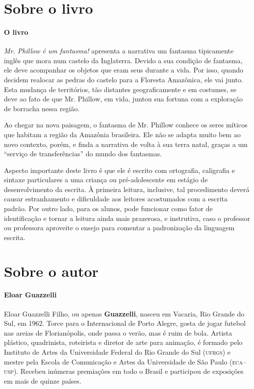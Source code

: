 \documentclass[11pt]{extarticle}
\begin{document}
\section{Sobre o livro}

\paragraph{O livro} \textit{Mr. Phillow é um fantasma!} apresenta a narrativa um fantasma tipicamente inglês 
que mora num castelo da Inglaterra. Devido a sua condição de fantasma, ele deve acompanhar
os objetos que eram seus durante a vida. Por isso, quando decidem realocar as pedras do castelo para 
a Floresta Amazônica, ele vai junto. Esta mudança de territórios, tão distantes geograficamente
e em costumes, se deve ao fato de que Mr. Phillow, em vida, juntou sua fortuna com a exploração de borracha
nessa região.

Ao chegar na nova paisagem, o fantasma de Mr. Phillow conhece os seres míticos que habitam a região da Amazônia
brasileira. Ele não se adapta muito bem ao novo contexto, porém, e finda a narrativa de volta à sua
terra natal, graças a um ``serviço de transferências'' do mundo dos fantasmas. 

Aspecto importante deste livro é que ele é escrito com ortografia, caligrafia e sintaxe 
particulares a uma criança ou pré-adolescente em estágio de desenvolvimento da 
escrita. À primeira leitura, inclusive, tal procedimento deverá causar estranhamento 
e dificuldade aos leitores acostumados com a escrita padrão. Por outro lado,
para os alunos, pode funcionar como fator de identificação e tornar a leitura
ainda mais prazerosa, e instrutiva, caso o professor ou professora aproveite o
ensejo para comentar a padronização da linguagem escrita. 



\section{Sobre o autor}

\paragraph{Eloar Guazzelli}


Eloar Guazzelli Filho, ou apenas \textbf{Guazzelli}, nasceu em Vacaria, Rio Grande do Sul, em 1962. 
Torce para o Internacional de Porto Alegre, gosta de jogar futebol nas areias de Florianópolis, onde passa o verão, mas é ruim de bola. Artista plástico, quadrinista, roteirista e diretor de arte para animação, é formado pelo Instituto de Artes da Universidade Federal do Rio Grande do Sul (\textsc{ufrgs}) e mestre pela Escola de Comunicação e Artes da Universidade de São Paulo (\textsc{eca--usp}). Recebeu inúmeras premiações em todo o Brasil e participou de exposições em mais de quinze países.
\end{document}
